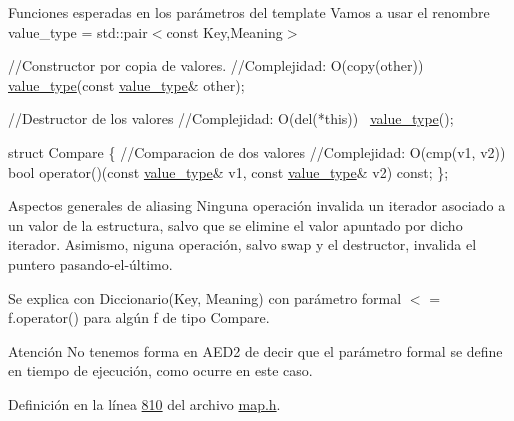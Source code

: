 \begin{DoxyParagraph}{Funciones esperadas en los parámetros del template}
Vamos a usar el renombre value\+\_\+type = std\+::pair$<$const Key,\+Meaning$>$


\begin{DoxyCode}
\textcolor{comment}{//Constructor por copia de valores.}
\textcolor{comment}{//Complejidad: O(copy(other))}
\hyperlink{classaed2_1_1map_a719db98e0ff9a837610f76be33264680_a719db98e0ff9a837610f76be33264680}{value\_type}(\textcolor{keyword}{const} \hyperlink{classaed2_1_1map_a719db98e0ff9a837610f76be33264680_a719db98e0ff9a837610f76be33264680}{value\_type}& other);

\textcolor{comment}{//Destructor de los valores}
\textcolor{comment}{//Complejidad: O(del(*this))}
~\hyperlink{classaed2_1_1map_a719db98e0ff9a837610f76be33264680_a719db98e0ff9a837610f76be33264680}{value\_type}();

\textcolor{keyword}{struct }Compare \{
  \textcolor{comment}{//Comparacion de dos valores}
  \textcolor{comment}{//Complejidad: O(cmp(v1, v2))}
  \textcolor{keywordtype}{bool} operator()(\textcolor{keyword}{const} \hyperlink{classaed2_1_1map_a719db98e0ff9a837610f76be33264680_a719db98e0ff9a837610f76be33264680}{value\_type}& v1, \textcolor{keyword}{const} \hyperlink{classaed2_1_1map_a719db98e0ff9a837610f76be33264680_a719db98e0ff9a837610f76be33264680}{value\_type}& v2) \textcolor{keyword}{const};
\};
\end{DoxyCode}
 
\end{DoxyParagraph}


\begin{DoxyParagraph}{Aspectos generales de aliasing}
Ninguna operación invalida un iterador asociado a un valor de la estructura, salvo que se elimine el valor apuntado por dicho iterador. Asimismo, niguna operación, salvo swap y el destructor, invalida el puntero pasando-\/el-\/último.
\end{DoxyParagraph}
\begin{DoxyParagraph}{Se explica con}
Diccionario(Key, Meaning) con parámetro formal $<$ = f.\+operator() para algún f de tipo Compare.
\end{DoxyParagraph}
\begin{DoxyAttention}{Atención}
No tenemos forma en A\+E\+D2 de decir que el parámetro formal se define en tiempo de ejecución, como ocurre en este caso. 
\end{DoxyAttention}


Definición en la línea \hyperlink{map_8h_source_l00810}{810} del archivo \hyperlink{map_8h_source}{map.\+h}.



